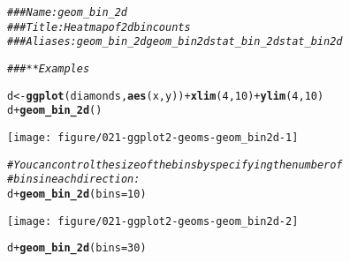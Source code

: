 \documentclass[a4paper,titlepage]{tufte-handout}\usepackage[]{graphicx}\usepackage[]{xcolor}
\makeatletter
\def\maxwidth{ %
  \ifdim\Gin@nat@width>\linewidth
    \linewidth
  \else
    \Gin@nat@width
  \fi
}
\newcommand{\hlnum}[1]{\textcolor[rgb]{0.686,0.059,0.569}{#1}}%
\newcommand{\hlcom}[1]{\textcolor[rgb]{0.678,0.584,0.686}{\textit{#1}}}%
\newcommand{\hlopt}[1]{\textcolor[rgb]{0,0,0}{#1}}%
\newcommand{\hldef}[1]{\textcolor[rgb]{0.345,0.345,0.345}{#1}}%
\newcommand{\hlkwb}[1]{\textcolor[rgb]{0.69,0.353,0.396}{#1}}%
\newcommand{\hlkwc}[1]{\textcolor[rgb]{0.333,0.667,0.333}{#1}}%
\newcommand{\hlkwd}[1]{\textcolor[rgb]{0.737,0.353,0.396}{\textbf{#1}}}%
\newenvironment{kframe}{%
 \def\at@end@of@kframe{}%
 \ifinner\ifhmode%
  \def\at@end@of@kframe{\end{minipage}}%
  \begin{minipage}{\columnwidth}%
 \fi\fi%
 \def\FrameCommand##1{\hskip\@totalleftmargin \hskip-\fboxsep
 \colorbox{shadecolor}{##1}\hskip-\fboxsep
     \hskip-\linewidth \hskip-\@totalleftmargin \hskip\columnwidth}%
 \MakeFramed {\advance\hsize-\width
   \@totalleftmargin\z@ \linewidth\hsize
   \@setminipage}}%
 {\par\unskip\endMakeFramed%
 \at@end@of@kframe}
\newenvironment{knitrout}{}{} %
\makeatother
\begin{document}
\begin{knitrout}
\color{fgcolor}\begin{kframe}
\begin{alltt}
\hlcom{### Name: geom_bin_2d}
\hlcom{### Title: Heatmap of 2d bin counts}
\hlcom{### Aliases: geom_bin_2d geom_bin2d stat_bin_2d stat_bin2d}

\hlcom{### ** Examples}

\hldef{d} \hlkwb{<-} \hlkwd{ggplot}\hldef{(diamonds,} \hlkwd{aes}\hldef{(x, y))} \hlopt{+} \hlkwd{xlim}\hldef{(}\hlnum{4}\hldef{,} \hlnum{10}\hldef{)} \hlopt{+} \hlkwd{ylim}\hldef{(}\hlnum{4}\hldef{,} \hlnum{10}\hldef{)}
\hldef{d} \hlopt{+} \hlkwd{geom_bin_2d}\hldef{()}
\end{alltt}


{\ttfamily\noindent\color{warningcolor}{\#\# Warning: Removed 478 rows containing non-finite outside the scale range\\\#\# (`stat\_bin2d()`).}}

{\ttfamily\noindent\color{warningcolor}{\#\# Warning: Removed 5 rows containing missing values or values outside the scale range\\\#\# (`geom\_tile()`).}}\end{kframe}
\texttt{[image: figure/021-ggplot2-geoms-geom\_bin2d-1]} 
\begin{kframe}\begin{alltt}
\hlcom{# You can control the size of the bins by specifying the number of}
\hlcom{# bins in each direction:}
\hldef{d} \hlopt{+} \hlkwd{geom_bin_2d}\hldef{(}\hlkwc{bins} \hldef{=} \hlnum{10}\hldef{)}
\end{alltt}


{\ttfamily\noindent\color{warningcolor}{\#\# Warning: Removed 478 rows containing non-finite outside the scale range\\\#\# (`stat\_bin2d()`).}}

{\ttfamily\noindent\color{warningcolor}{\#\# Warning: Removed 6 rows containing missing values or values outside the scale range\\\#\# (`geom\_tile()`).}}\end{kframe}
\texttt{[image: figure/021-ggplot2-geoms-geom\_bin2d-2]} 
\begin{kframe}\begin{alltt}
\hldef{d} \hlopt{+} \hlkwd{geom_bin_2d}\hldef{(}\hlkwc{bins} \hldef{=} \hlnum{30}\hldef{)}
\end{alltt}



\end{kframe}
\end{knitrout}
\end{document}
